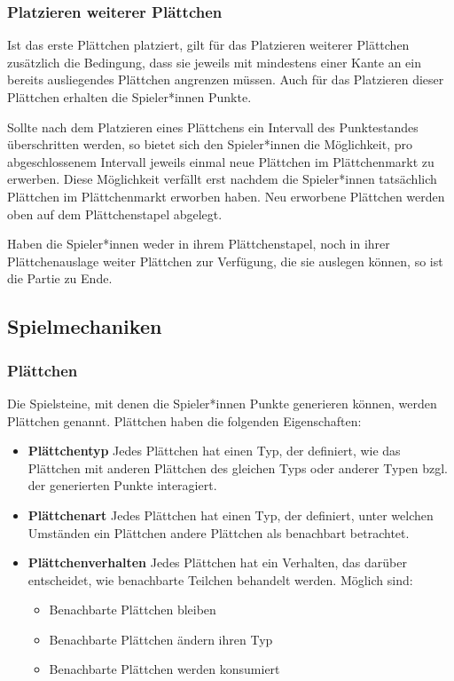\documentclass[../main.tex]{subfiles}
\begin{document}
	\subsubsection{Platzieren weiterer Plättchen}
	\par Ist das erste Plättchen platziert, gilt für das Platzieren weiterer Plättchen zusätzlich die Bedingung, dass sie jeweils mit mindestens einer Kante an ein bereits ausliegendes Plättchen angrenzen müssen. Auch für das Platzieren dieser Plättchen erhalten die Spieler*innen Punkte.
	\par Sollte nach dem Platzieren eines Plättchens ein Intervall des Punktestandes überschritten werden, so bietet sich den Spieler*innen die Möglichkeit, pro abgeschlossenem Intervall jeweils einmal neue Plättchen im Plättchenmarkt zu erwerben. Diese Möglichkeit verfällt erst nachdem die Spieler*innen tatsächlich Plättchen im Plättchenmarkt erworben haben. Neu erworbene Plättchen werden oben auf dem Plättchenstapel abgelegt.
	\par Haben die Spieler*innen weder in ihrem Plättchenstapel, noch in ihrer Plättchenauslage weiter Plättchen zur Verfügung, die sie auslegen können, so ist die Partie zu Ende.
	
	\subsection{Spielmechaniken}
	\label{section:Spielmechaniken}
	\subsubsection{Plättchen}
	\par Die Spielsteine, mit denen die Spieler*innen Punkte generieren können, werden Plättchen genannt. Plättchen haben die folgenden Eigenschaften:
	\begin{itemize}
		\item \textbf{Plättchentyp} Jedes Plättchen hat einen Typ, der definiert, wie das Plättchen mit anderen Plättchen des gleichen Typs oder anderer Typen bzgl. der generierten Punkte interagiert.
		\item \textbf{Plättchenart} Jedes Plättchen hat einen Typ, der definiert, unter welchen Umständen ein Plättchen andere Plättchen als benachbart betrachtet.
		\item \textbf{Plättchenverhalten} Jedes Plättchen hat ein Verhalten, das darüber entscheidet, wie benachbarte Teilchen behandelt werden. Möglich sind:
		\begin{itemize}
			\item Benachbarte Plättchen bleiben
			\item Benachbarte Plättchen ändern ihren Typ
			\item Benachbarte Plättchen werden konsumiert 
		\end{itemize}
	\end{itemize}
	
\end{document}
